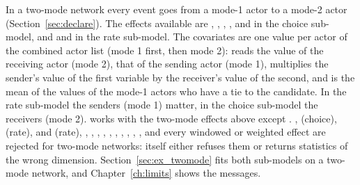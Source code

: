 In a two-mode network every event goes from a mode-1 actor to a mode-2 actor (Section~\ref{sec:declare}). The effects available are , , , ,  and  in the choice sub-model, and  and  in the rate sub-model. The covariates are one value per actor of the combined actor list (mode 1 first, then mode 2):  reads the value of the receiving actor (mode 2),  that of the sending actor (mode 1),  multiplies the sender's value of the first variable by the receiver's value of the second, and  is the mean of the values of the mode-1 actors who have a tie to the candidate. In the rate sub-model the senders (mode 1) matter, in the choice sub-model the receivers (mode 2).  works with the two-mode effects above except . ,  (choice),  (rate),  and  (rate), , , , , , , , , , ,  and every windowed or weighted effect are rejected for two-mode networks: \goldfish{} itself either refuses them or returns statistics of the wrong dimension. Section~\ref{sec:ex_twomode} fits both sub-models on a two-mode network, and Chapter~\ref{ch:limits} shows the messages.
